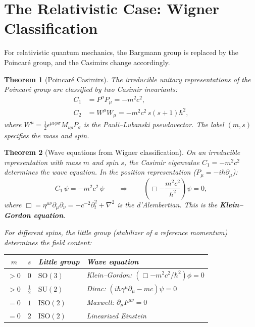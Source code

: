 \documentclass[12pt]{article}
\theoremstyle{plain}
\newtheorem{theorem}{Theorem}[section]
\theoremstyle{definition}
\theoremstyle{remark}
\newcommand{\SO}{\mathrm{SO}}
\newcommand{\SU}{\mathrm{SU}}
\newcommand{\ISO}{\mathrm{ISO}}
\begin{document}
\section{The Relativistic Case: Wigner Classification}
\label{sec:wigner}

For relativistic quantum mechanics, the Bargmann group is replaced by the Poincar\'e group, and the Casimirs change accordingly.

\begin{theorem}[Poincar\'e Casimirs]\label{thm:poincare-casimirs}
The irreducible unitary representations of the Poincar\'e group are classified by two Casimir invariants:
\begin{align}
C_1 &= P^\mu P_\mu = -m^2c^2, \label{eq:C1-poinc}\\
C_2 &= W^\mu W_\mu = -m^2c^2\,s(s+1)\hbar^2, \label{eq:C2-poinc}
\end{align}
where $W^\mu = \frac{1}{2}\epsilon^{\mu\nu\rho\sigma}M_{\nu\rho}P_\sigma$ is the Pauli--Lubanski pseudovector. The label $(m, s)$ specifies the mass and spin.
\end{theorem}

\begin{theorem}[Wave equations from Wigner classification]\label{thm:wigner-eqs}
On an irreducible representation with mass $m$ and spin $s$, the Casimir eigenvalue $C_1 = -m^2c^2$ determines the wave equation. In the position representation ($P_\mu = -i\hbar\partial_\mu$):
\begin{equation}
C_1\,\psi = -m^2c^2\,\psi \qquad\Longrightarrow\qquad \left(\Box - \frac{m^2c^2}{\hbar^2}\right)\psi = 0,
\end{equation}
where $\Box = \eta^{\mu\nu}\partial_\mu\partial_\nu = -c^{-2}\partial_t^2 + \nabla^2$ is the d'Alembertian. This is the \textbf{Klein--Gordon equation}.

For different spins, the little group (stabilizer of a reference momentum) determines the field content:
\begin{center}\small
\begin{tabular}{ccll}\toprule
$m$ & $s$ & \textbf{Little group} & \textbf{Wave equation} \\\midrule
$> 0$ & $0$ & $\SO(3)$ & Klein--Gordon: $(\Box - m^2c^2/\hbar^2)\phi = 0$ \\
$> 0$ & $\frac{1}{2}$ & $\SU(2)$ & Dirac: $(i\hbar\gamma^\mu\partial_\mu - mc)\psi = 0$ \\
$= 0$ & $1$ & $\ISO(2)$ & Maxwell: $\partial_\mu F^{\mu\nu} = 0$ \\
$= 0$ & $2$ & $\ISO(2)$ & Linearized Einstein \\
\bottomrule
\end{tabular}
\end{center}
\end{theorem}
\end{document}
